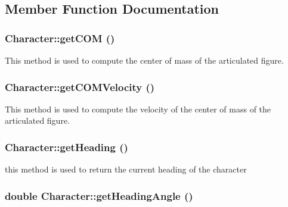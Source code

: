 \subsection{Member Function Documentation}
\hypertarget{classCartWheel_1_1Core_1_1Character_afbe6ac8fd32f7b5a40bd9261532ea8b6}{
\subsubsection[{getCOM}]{ Character::getCOM ()}}
\label{classCartWheel_1_1Core_1_1Character_afbe6ac8fd32f7b5a40bd9261532ea8b6}
This method is used to compute the center of mass of the articulated figure. \hypertarget{classCartWheel_1_1Core_1_1Character_a74b600f6ada76d3090d15c260deab585}{
\subsubsection[{getCOMVelocity}]{ Character::getCOMVelocity ()}}
\label{classCartWheel_1_1Core_1_1Character_a74b600f6ada76d3090d15c260deab585}
This method is used to compute the velocity of the center of mass of the articulated figure. \hypertarget{classCartWheel_1_1Core_1_1Character_a17640e521bf8b1eab82c10cec6175f14}{
\subsubsection[{getHeading}]{ Character::getHeading ()}}
\label{classCartWheel_1_1Core_1_1Character_a17640e521bf8b1eab82c10cec6175f14}
this method is used to return the current heading of the character \hypertarget{classCartWheel_1_1Core_1_1Character_ac9c987a3deecb7d310d2baae5830fae6}{
\subsubsection[{getHeadingAngle}]{\setlength{\rightskip}{0pt plus 5cm}double Character::getHeadingAngle ()}}
